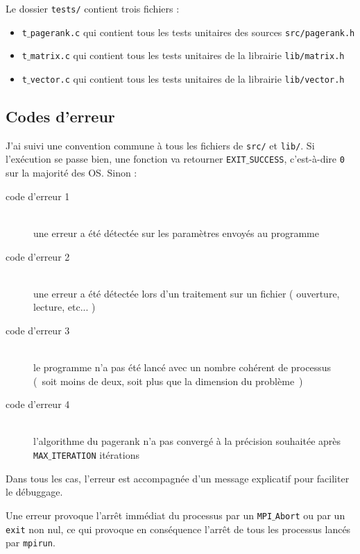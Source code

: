 \documentclass[a4paper,12pt]{article}
\begin{document}
Le dossier \texttt{tests/} contient trois fichiers :
\medskip
\begin{itemize}
  \item \texttt{t$\_$pagerank.c} qui contient tous les tests unitaires des sources \texttt{src/pagerank.h}
  \item \texttt{t$\_$matrix.c} qui contient tous les tests unitaires de la librairie \texttt{lib/matrix.h}
  \item \texttt{t$\_$vector.c} qui contient tous les tests unitaires de la librairie \texttt{lib/vector.h}
\end{itemize}

\subsection{Codes d'erreur}

J'ai suivi une convention commune à tous les fichiers de \texttt{src/} et \texttt{lib/}. Si l'exécution se passe bien, une fonction va retourner \texttt{EXIT$\_$SUCCESS}, c'est-à-dire \texttt{0} sur la majorité des OS. Sinon :

\begin{description}
  \item[code d'erreur 1]$ $\\une erreur a été détectée sur les paramètres envoyés au programme
  \item[code d'erreur 2]$ $\\une erreur a été détectée lors d'un traitement sur un fichier ( ouverture, lecture, etc... ) 
  \item[code d'erreur 3]$ $\\le programme n'a pas été lancé avec un nombre cohérent de processus (~soit moins de deux, soit plus que la dimension du problème~)
  \item[code d'erreur 4]$ $\\l'algorithme du pagerank n'a pas convergé à la précision souhaitée après \texttt{MAX$\_$ITE\-RATION} itérations
\end{description}

Dans tous les cas, l'erreur est accompagnée d'un message explicatif pour faciliter le débuggage.

\bigskip

Une erreur provoque l'arrêt immédiat du processus par un \texttt{MPI$\_$Abort} ou par un \texttt{exit} non nul, ce qui provoque en conséquence l'arrêt de tous les processus lancés par \texttt{mpirun}.

\newpage
\end{document}
